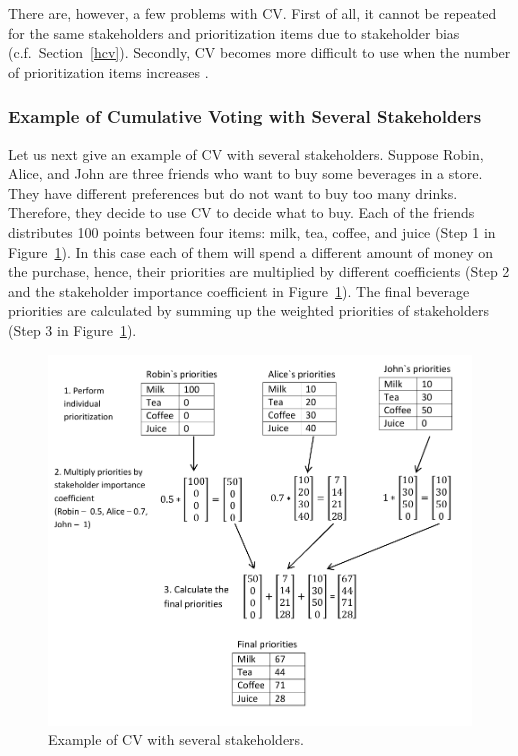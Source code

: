 There are, however, a few problems with CV. First of all, it cannot be repeated for the
same stakeholders and prioritization items due to stakeholder bias
\cite{Leffingwell1999} (c.f.\ Section~\ref{hcv}). Secondly, CV 
becomes more difficult to use when the number of prioritization items 
increases \cite{Berander2009a}.

\subsubsection{Example of Cumulative Voting with Several Stakeholders}

Let us next give an example of CV with several stakeholders. Suppose Robin,
Alice, and John are three friends who want to buy some beverages in
a store. They have different preferences but do not want to buy too
many drinks. Therefore, they decide to use CV to decide what to buy.
Each of the friends distributes 100 points between four items: milk,
tea, coffee, and juice (Step 1 in Figure~\ref{fig:Example-of-Cumulative}).
In this case each of them will spend a different amount of money on the purchase,
hence, their priorities are multiplied by different coefficients
(Step 2 and the stakeholder importance coefficient in Figure~\ref{fig:Example-of-Cumulative}).
The final beverage priorities are calculated by summing up the weighted priorities
of stakeholders (Step 3 in Figure~\ref{fig:Example-of-Cumulative}).

\begin{figure}
	\center
\includegraphics[scale=0.55]{fig/cv}
\caption{\label{fig:Example-of-Cumulative}Example of CV with several stakeholders.}
\end{figure}

